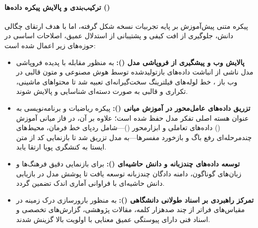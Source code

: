 \paragraph*{ترکیب‌بندی و پالایش پیکره داده‌ها ()}
پیکره متنی پیش‌آموزش بر پایه تجربیات نسخه  \cite{deepseek2024v3} شکل گرفته، اما با هدف ارتقای چگالی دانش، جلوگیری از افت کیفی و پشتیبانی از استدلال عمیق، اصلاحات اساسی در حوزه‌های زیر اعمال شده است:
\begin{itemize}
    \item \textbf{پالایش وب و پیشگیری از فروپاشی مدل ():} به منظور مقابله با پدیده فروپاشی مدل ناشی از انباشت داده‌های بازتولیدشده توسط هوش مصنوعی و متون قالبی در وب باز \cite{zhu2024synthesize}، خط لوله‌های فیلترینگ سخت‌گیرانه‌ای تعبیه شد تا محتواهای ماشینی، تکراری و قالبی به صورت دسته‌ای شناسایی و پالایش شوند.
    \item \textbf{تزریق داده‌های عامل‌محور در آموزش میانی ():} پیکره ریاضیات و برنامه‌نویسی به عنوان هسته اصلی تفکر مدل حفظ شده است؛ علاوه بر آن، در فاز میانی آموزش () داده‌های تعاملی و ابزارمحور ()—شامل ردپای خط فرمان، محیط‌های چندمرحله‌ای رفع باگ و بازخورد مفسرها—به مدل تزریق شد تا بازنمایی کد از متن ایستا به کنشگری پویا ارتقا یابد.
    \item \textbf{توسعه داده‌های چندزبانه و دانش حاشیه‌ای ():} برای بازنمایی دقیق فرهنگ‌ها و زبان‌های گوناگون، دامنه دادگان چندزبانه توسعه یافت تا پوشش مدل در بازیابی دانش حاشیه‌ای با فراوانی آماری اندک تضمین گردد.
    \item \textbf{تمرکز راهبردی بر اسناد طولانی دانشگاهی ():} به منظور بارورسازی درک زمینه در مقیاس‌های فراتر از چند صدهزار کلمه، مقالات پژوهشی، گزارش‌های تخصصی و اسناد فنی دارای پیوستگی عمیق معنایی با اولویت بالا گزینش شدند.
\end{itemize}

